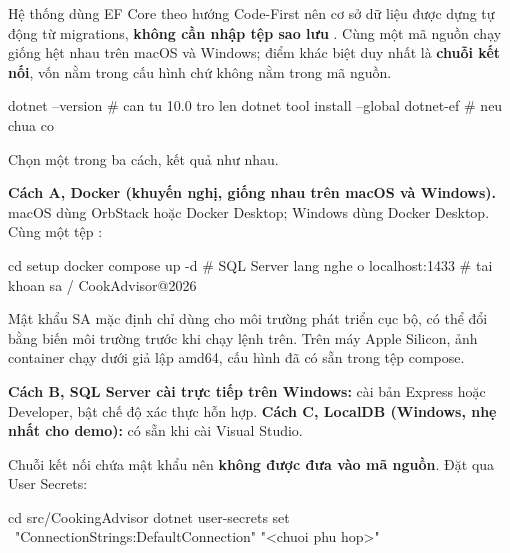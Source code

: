 

Hệ thống dùng EF Core theo hướng Code-First nên cơ sở dữ liệu được dựng tự động
từ migrations, \textbf{không cần nhập tệp sao lưu} . Cùng một mã nguồn
chạy giống hệt nhau trên macOS và Windows; điểm khác biệt duy nhất là \textbf{chuỗi
kết nối}, vốn nằm trong cấu hình chứ không nằm trong mã nguồn.


\begin{codeblock}
dotnet --version                     # can tu 10.0 tro len
dotnet tool install --global dotnet-ef    # neu chua co
\end{codeblock}


Chọn một trong ba cách, kết quả như nhau.

\textbf{Cách A, Docker (khuyến nghị, giống nhau trên macOS và Windows).} macOS
dùng OrbStack hoặc Docker Desktop; Windows dùng Docker Desktop. Cùng một tệp
:

\begin{codeblock}
cd setup
docker compose up -d
# SQL Server lang nghe o localhost:1433
# tai khoan sa / CookAdvisor@2026
\end{codeblock}

Mật khẩu SA mặc định chỉ dùng cho môi trường phát triển cục bộ, có thể đổi bằng
biến môi trường  trước khi chạy lệnh trên. Trên máy
Apple Silicon, ảnh container chạy dưới giả lập amd64, cấu hình đã có sẵn trong
tệp compose.

\textbf{Cách B, SQL Server cài trực tiếp trên Windows:} cài bản Express hoặc
Developer, bật chế độ xác thực hỗn hợp. \textbf{Cách C, LocalDB (Windows, nhẹ
nhất cho demo):} có sẵn khi cài Visual Studio.


Chuỗi kết nối chứa mật khẩu nên \textbf{không được đưa vào mã nguồn}. Đặt qua
User Secrets:

\begin{codeblock}
cd src/CookingAdvisor
dotnet user-secrets set \
  "ConnectionStrings:DefaultConnection" "<chuoi phu hop>"
\end{codeblock}

